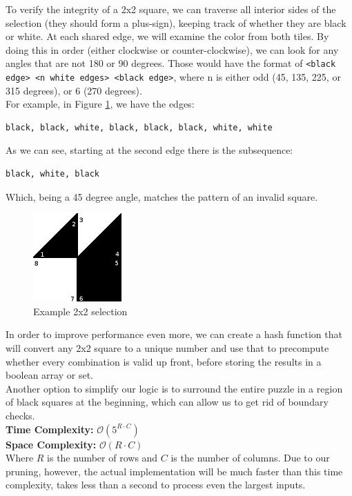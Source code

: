 To verify the integrity of a 2x2 square, we can traverse all interior sides of
the selection (they should form a plus-sign), keeping track of whether they
are black or white. At each shared edge, we will examine the color from both
tiles. By doing this in order (either clockwise or counter-clockwise), we can
look for any angles that are not 180 or 90 degrees. Those would have the format
of \verb|<black edge> <n white edges> <black edge>|, where n is either odd
(45, 135, 225, or 315 degrees), or 6 (270 degrees).\\

For example, in Figure \ref{mosaic:example-selection}, we have the edges:
\begin{verbatim}
black, black, white, black, black, black, white, white
\end{verbatim}
As we can see, starting at the second edge there is the subsequence:
\begin{verbatim}
black, white, black
\end{verbatim}
Which, being a 45 degree angle, matches the pattern of an invalid square.\\

\pagebreak

\begin{figure}[h!]
  \centering
  \includegraphics[height=128px]{Images/mosaic-tile-example.png}
  \caption{Example 2x2 selection}
  \label{mosaic:example-selection}
\end{figure}

In order to improve performance even more, we can create a hash function that
will convert any 2x2 square to a unique number and use that to precompute
whether every combination is valid up front, before storing the results in a
boolean array or set.\\

Another option to simplify our logic is to surround the entire puzzle in a region
of black squares at the beginning, which can allow us to get rid of boundary
checks.\\
\hfill\break
\textbf{Time Complexity:} $\mathcal{O}(5^{R \cdot C})$\\
\textbf{Space Complexity:} $\mathcal{O}(R \cdot C)$\\
Where $R$ is the number of rows and $C$ is the number of columns. Due to our
pruning, however, the actual implementation will be much faster than this time
complexity, takes less than a second to process even the largest inputs.
\pagebreak
